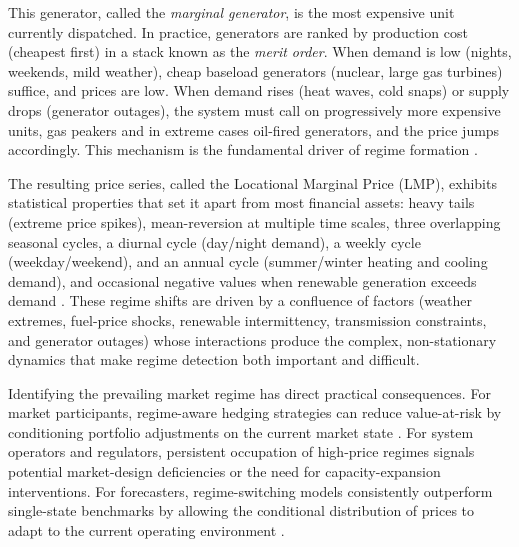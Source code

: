 \documentclass[12pt]{article}
\begin{document}
This generator, called the \emph{marginal generator}, is the most expensive unit currently dispatched.
In practice, generators are ranked by production cost (cheapest first) in a stack known as the \emph{merit order}.
When demand is low (nights, weekends, mild weather), cheap baseload generators (nuclear, large gas turbines) suffice, and prices are low.
When demand rises (heat waves, cold snaps) or supply drops (generator outages), the system must call on progressively more expensive units, gas peakers and in extreme cases oil-fired generators, and the price jumps accordingly.
This mechanism is the fundamental driver of regime formation \citep{weron2014}.

The resulting price series, called the Locational Marginal Price (LMP), exhibits statistical properties that set it apart from most financial assets: heavy tails (extreme price spikes), mean-reversion at multiple time scales, three overlapping seasonal cycles, a diurnal cycle (day/night demand), a weekly cycle (weekday/weekend), and an annual cycle (summer/winter heating and cooling demand), and occasional negative values when renewable generation exceeds demand \citep{ziel2018, weron2006}.
These regime shifts are driven by a confluence of factors (weather extremes, fuel-price shocks, renewable intermittency, transmission constraints, and generator outages) whose interactions produce the complex, non-stationary dynamics that make regime detection both important and difficult.

Identifying the prevailing market regime has direct practical consequences.
For market participants, regime-aware hedging strategies can reduce value-at-risk by conditioning portfolio adjustments on the current market state \citep{coulon2014}.
For system operators and regulators, persistent occupation of high-price regimes signals potential market-design deficiencies or the need for capacity-expansion interventions.
For forecasters, regime-switching models consistently outperform single-state benchmarks by allowing the conditional distribution of prices to adapt to the current operating environment \citep{janczura2013, nowotarski2018}.

\end{document}
